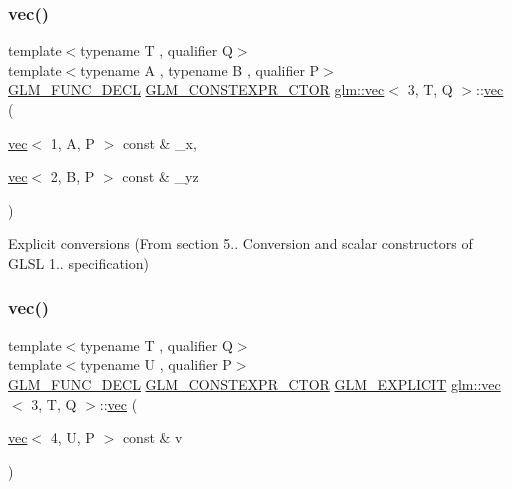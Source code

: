 \subsubsection{\texorpdfstring{vec()}{vec()}\hspace{0.1cm}{\footnotesize\ttfamily [11/23]}}
{\footnotesize\ttfamily template$<$typename T , qualifier Q$>$ \\
template$<$typename A , typename B , qualifier P$>$ \\
\mbox{\hyperlink{setup_8hpp_ab2d052de21a70539923e9bcbf6e83a51}{G\+L\+M\+\_\+\+F\+U\+N\+C\+\_\+\+D\+E\+CL}} \mbox{\hyperlink{setup_8hpp_ad34178a09666081abdb573c14d1f4a5a}{G\+L\+M\+\_\+\+C\+O\+N\+S\+T\+E\+X\+P\+R\+\_\+\+C\+T\+OR}} \mbox{\hyperlink{structglm_1_1vec}{glm\+::vec}}$<$ 3, T, Q $>$\+::\mbox{\hyperlink{structglm_1_1vec}{vec}} (\begin{DoxyParamCaption}\item[{\mbox{\hyperlink{structglm_1_1vec}{vec}}$<$ 1, A, P $>$ const \&}]{\+\_\+x,  }\item[{\mbox{\hyperlink{structglm_1_1vec}{vec}}$<$ 2, B, P $>$ const \&}]{\+\_\+yz }\end{DoxyParamCaption})}



Explicit conversions (From section 5.. Conversion and scalar constructors of G\+L\+SL 1.. specification) 

\mbox{\label{structglm_1_1vec_3_013_00_01_t_00_01_q_01_4_a6a3c6e504114be5310317d725eda50ea}} 
\subsubsection{\texorpdfstring{vec()}{vec()}\hspace{0.1cm}{\footnotesize\ttfamily [12/23]}}
{\footnotesize\ttfamily template$<$typename T , qualifier Q$>$ \\
template$<$typename U , qualifier P$>$ \\
\mbox{\hyperlink{setup_8hpp_ab2d052de21a70539923e9bcbf6e83a51}{G\+L\+M\+\_\+\+F\+U\+N\+C\+\_\+\+D\+E\+CL}} \mbox{\hyperlink{setup_8hpp_ad34178a09666081abdb573c14d1f4a5a}{G\+L\+M\+\_\+\+C\+O\+N\+S\+T\+E\+X\+P\+R\+\_\+\+C\+T\+OR}} \mbox{\hyperlink{setup_8hpp_a6c74f5a5e7b134ab69023ff9a30d4d5d}{G\+L\+M\+\_\+\+E\+X\+P\+L\+I\+C\+IT}} \mbox{\hyperlink{structglm_1_1vec}{glm\+::vec}}$<$ 3, T, Q $>$\+::\mbox{\hyperlink{structglm_1_1vec}{vec}} (\begin{DoxyParamCaption}\item[{\mbox{\hyperlink{structglm_1_1vec}{vec}}$<$ 4, U, P $>$ const \&}]{v }\end{DoxyParamCaption})}



